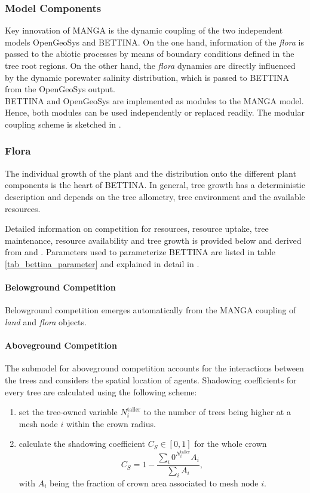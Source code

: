 \documentclass[manusscript, 12p, authoryear]{elsarticle}
\begin{document}
\subsubsection{Model Components}
Key innovation of MANGA is the dynamic coupling of the two independent models OpenGeoSys and BETTINA.
On the one hand, information of the \textit{flora} is passed to the abiotic processes by means of boundary conditions defined in the tree root regions.
On the other hand, the \textit{flora} dynamics are directly influenced by the dynamic porewater salinity distribution, which is passed to BETTINA from the OpenGeoSys output.\\
BETTINA and OpenGeoSys are implemented as modules to the MANGA model.
Hence, both modules can be used independently or replaced readily.
The modular coupling scheme is sketched in \citet{Bathmann2020}.

\subsubsection{Flora}
The individual growth of the plant and the distribution onto the different plant components is the heart of BETTINA.
In general, tree growth has a deterministic description and depends on the tree allometry, tree environment and the available resources.

Detailed information on competition for resources, resource uptake, tree maintenance, resource availability and tree growth is provided below and derived from \citet{Ronny2014} and \citet{Peters2018}.
Parameters used to parameterize BETTINA are listed in table \ref{tab_bettina_parameter} and explained in detail in \citet{Ronny2014}.
\paragraph{\textbf{Belowground Competition}}
Belowground competition emerges automatically from the MANGA coupling of \textit{land} and \textit{flora} objects.
\paragraph{\textbf{Aboveground Competition}}
The submodel for aboveground competition accounts for the interactions between the trees and considers the spatial location of agents.
Shadowing coefficients for every tree are calculated using the following scheme:
\begin{enumerate}
\item set the tree-owned variable $N^{\text{taller}}_i$ to the number of trees being higher at a mesh node $i$ within the crown radius.
\item calculate the shadowing coefficient $C_S\in [0,1]$ for the whole crown
\begin{equation}
C_S = 1-\frac{\sum_i 0^{N^{\text{taller}}_i} A_i}{\sum_i A_i},
\end{equation}
with $A_i$ being the fraction of crown area associated to mesh node $i$.
\end{enumerate}
\end{document}
